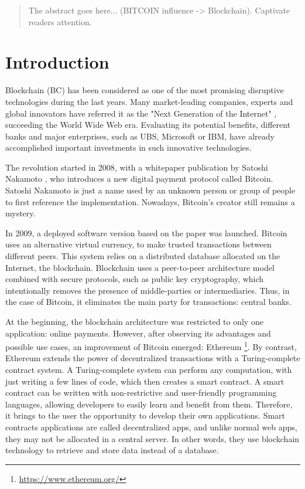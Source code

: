 \begin{abstract}
 The abstract goes here... (BITCOIN influence -> Blockchain). Captivate readers attention.
\end{abstract}




\chapter{Introduction}

Blockchain (BC) has been considered as one of the most promising disruptive technologies during the last years. Many market-leading companies, experts and global innovators have referred it as the "Next Generation of the Internet" \cite{JenClarck2017}, succeeding the World Wide Web era. Evaluating its potential benefits, different banks and major enterprises, such as UBS, Microsoft or IBM, have already accomplished important investments in such innovative technologies.

The revolution started in 2008, with a whitepaper publication by Satoshi Nakamoto \cite{nakamoto2008bitcoin}, who introduces a new digital payment protocol called Bitcoin. Satoshi Nakamoto is just a name used by an unknown person or group of people to first reference the implementation. Nowadays, Bitcoin's creator still remains a mystery.

In 2009, a deployed software version based on the paper was launched. Bitcoin uses an alternative virtual currency, to make trusted transactions between different peers. This system relies on a distributed database allocated on the Internet, the blockchain. Blockchain uses a peer-to-peer architecture model combined with secure protocols, such as public key cryptography, which intentionally removes the presence of middle-parties or intermediaries. Thus, in the case of Bitcoin, it eliminates the main party for transactions: central banks.

At the beginning, the blockchain architecture was restricted to only one application: online payments. However, after observing its advantages and possible use cases, an improvement of Bitcoin emerged: Ethereum \footnote{\url{https://www.ethereum.org/}}. By contrast, Ethereum extends the power of decentralized transactions with a Turing-complete contract system. A Turing-complete system can perform any computation, with just writing a few lines of code, which then creates a smart contract. A smart contract can be written with non-restrictive and user-friendly programming languages, allowing developers to easily learn and benefit from them. Therefore, it brings to the user the opportunity to develop their own applications. Smart contracts applications are called decentralized apps, and unlike normal web apps, they may not be allocated in a central server. In other words, they use blockchain technology to retrieve and store data instead of a database.


